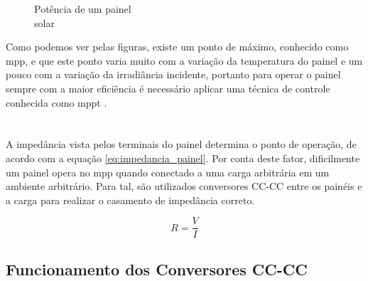 \begin{figure}[!htpb]
\begin{minipage}{.5\textwidth}
\begin{center}
\caption[caption]{Potência de um painel \\\hspace{\textwidth} solar}
\label{figura_potência_painel_irradiância}
\end{center}
\end{minipage}
\end{figure}

Como podemos ver pelas figuras, existe um ponto de máximo, conhecido como \gls{mpp}, e que este ponto varia muito com a variação da temperatura do painel e um pouco com a variação da irradiância incidente, portanto para operar o painel sempre com a maior eficiência é necessário aplicar uma técnica de controle conhecida como \gls{mppt} \cite{ahmed2016}.

\section{}

A impedância vista pelos terminais do painel determina o ponto de operação, de acordo com a equação \ref{eq:impedancia_painel}. Por conta deste fator, dificilmente um painel opera no \gls{mpp} quando conectado a uma carga arbitrária em um ambiente arbitrário. Para tal, são utilizados conversores CC-CC entre os painéis e a carga para realizar o casamento de impedância correto.

\begin{equation}
R = \frac{V}{I}
\label{eq:impedancia_painel}
\end{equation}

\subsection{Funcionamento dos Conversores CC-CC}

